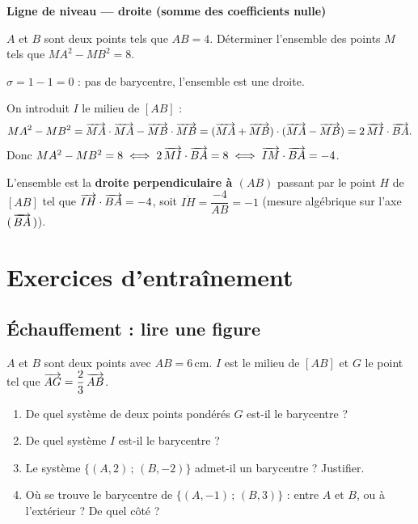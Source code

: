 \exerciceresolu
\textbf{Ligne de niveau — droite (somme des coefficients nulle)}

$A$ et $B$ sont deux points tels que $AB = 4$. Déterminer l'ensemble des points
$M$ tels que $MA^2 - MB^2 = 8$.

\solution

$\sigma = 1 - 1 = 0$ : pas de barycentre, l'ensemble est une droite.

On introduit $I$ le milieu de $[AB]$ :
$$
MA^2 - MB^2 = \overrightarrow{MA}\cdot\overrightarrow{MA} - \overrightarrow{MB}\cdot\overrightarrow{MB}
= (\overrightarrow{MA}+\overrightarrow{MB})\cdot(\overrightarrow{MA}-\overrightarrow{MB}) = 2\,\overrightarrow{MI}\cdot\overrightarrow{BA}.
$$
Donc $MA^2 - MB^2 = 8 \iff 2\,\overrightarrow{MI}\cdot\overrightarrow{BA} = 8 \iff \overrightarrow{IM}\cdot\overrightarrow{BA} = -4$.

L'ensemble est la \textbf{droite perpendiculaire à $(AB)$} passant par le point
$H$ de $[AB]$ tel que $\overrightarrow{IH}\cdot\overrightarrow{BA} = -4$, soit $\overline{IH} = \dfrac{-4}{AB} = -1$
(mesure algébrique sur l'axe $(\,\overrightarrow{BA}\,)$).


\section{Exercices d'entraînement}

\subsection{Échauffement : lire une figure}

$A$ et $B$ sont deux points avec $AB = 6\,$cm. $I$ est le milieu de $[AB]$ et
$G$ le point tel que $\overrightarrow{AG} = \dfrac{2}{3}\,\overrightarrow{AB}$.

\begin{center}
\end{center}

\begin{enumerate}
	\item De quel système de deux points pondérés $G$ est-il le barycentre ?
	\item De quel système $I$ est-il le barycentre ?
	\item Le système $\{(A,2)\,;\,(B,-2)\}$ admet-il un barycentre ? Justifier.
	\item Où se trouve le barycentre de $\{(A,-1)\,;\,(B,3)\}$ : entre $A$ et $B$,
	ou à l'extérieur ? De quel côté ?
\end{enumerate}

